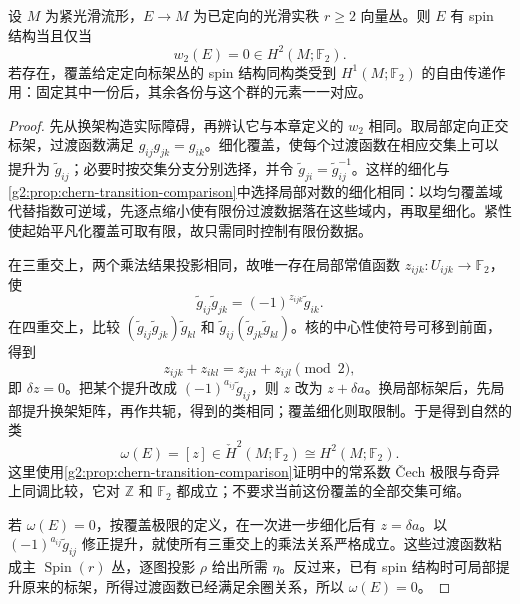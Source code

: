 \begin{theorem}\label{g2:thm:spin-obstruction}
	设 \(M\) 为紧光滑流形，\(E\to M\) 为已定向的光滑实秩 \(r\ge2\) 向量丛。则 \(E\) 有 spin 结构当且仅当
	\[
		w_2(E)=0\in H^2(M;\mathbb F_2).
	\]
	若存在，覆盖给定定向标架丛的 spin 结构同构类受到 \(H^1(M;\mathbb F_2)\) 的自由传递作用：固定其中一份后，其余各份与这个群的元素一一对应。
\end{theorem}
\begin{proof}
	先从换架构造实际障碍，再辨认它与本章定义的 \(w_2\) 相同。取局部定向正交标架，过渡函数满足 \(g_{ij}g_{jk}=g_{ik}\)。细化覆盖，使每个过渡函数在相应交集上可以提升为 \(\widetilde g_{ij}\)；必要时按交集分支分别选择，并令 \(\widetilde g_{ji}=\widetilde g_{ij}^{-1}\)。这样的细化与\cref{g2:prop:chern-transition-comparison}中选择局部对数的细化相同：以均匀覆盖域代替指数可逆域，先逐点缩小使有限份过渡数据落在这些域内，再取星细化。紧性使起始平凡化覆盖可取有限，故只需同时控制有限份数据。

	在三重交上，两个乘法结果投影相同，故唯一存在局部常值函数 \(z_{ijk}:U_{ijk}\to\mathbb F_2\)，使
	\begin{equation}\label{g2:eq:spin-transition-obstruction}
		\widetilde g_{ij}\widetilde g_{jk}=(-1)^{z_{ijk}}\widetilde g_{ik}.
	\end{equation}
	在四重交上，比较 \((\widetilde g_{ij}\widetilde g_{jk})\widetilde g_{kl}\) 和 \(\widetilde g_{ij}(\widetilde g_{jk}\widetilde g_{kl})\)。核的中心性使符号可移到前面，得到
	\[
		z_{ijk}+z_{ikl}=z_{jkl}+z_{ijl}\pmod2,
	\]
	即 \(\delta z=0\)。把某个提升改成 \((-1)^{a_{ij}}\widetilde g_{ij}\)，则 \(z\) 改为 \(z+\delta a\)。换局部标架后，先局部提升换架矩阵，再作共轭，得到的类相同；覆盖细化则取限制。于是得到自然的类
	\[
		\omega(E)=[z]\in\check H^2(M;\mathbb F_2)\cong H^2(M;\mathbb F_2).
	\]
	这里使用\cref{g2:prop:chern-transition-comparison}证明中的常系数 Čech 极限与奇异上同调比较，它对 \(\mathbb Z\) 和 \(\mathbb F_2\) 都成立；不要求当前这份覆盖的全部交集可缩。

	若 \(\omega(E)=0\)，按覆盖极限的定义，在一次进一步细化后有 \(z=\delta a\)。以 \((-1)^{a_{ij}}\widetilde g_{ij}\) 修正提升，就使所有三重交上的乘法关系严格成立。这些过渡函数粘成主 \(\operatorname{Spin}(r)\) 丛，逐图投影 \(\rho\) 给出所需 \(\eta\)。反过来，已有 spin 结构时可局部提升原来的标架，所得过渡函数已经满足余圈关系，所以 \(\omega(E)=0\)。


\end{proof}
